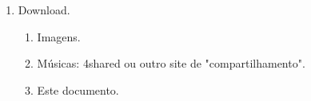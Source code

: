\begin{enumerate}
	\item Download.
	\begin{enumerate}
		\item Imagens.
		\item Músicas: 4shared ou outro site de "compartilhamento".
		\item Este documento.
	\end{enumerate}
\end{enumerate}